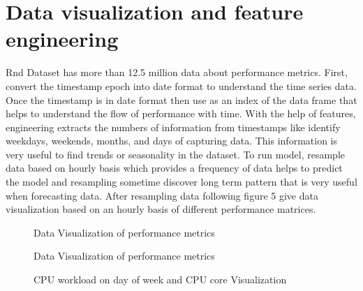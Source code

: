 \section{ Data visualization and  feature engineering}
Rnd Dataset has more than 12.5 million data about performance metrics. First, convert the timestamp epoch into date format to understand the time series data. Once the timestamp is in date format then use as an index of the data frame that helps to understand the flow of performance with time. With the help of features, engineering extracts the numbers of information from timestamps like identify weekdays, weekends, months, and days of capturing data. This information is very useful to find trends or seasonality in the dataset. To run model, resample data based on hourly basis which provides a frequency of data helps to predict the model and resampling sometime discover long term pattern that is very useful when forecasting data.
After resampling data following figure 5 give data visualization based on an hourly basis of different performance matrices.




\begin{figure}[htp]


\caption{Data Visualization of performance metrics}
\label{fig:visual1}
\end{figure}


\begin{figure}[htp]


\caption{Data Visualization of performance metrics }
\label{fig:visual}
\end{figure}



\begin{figure}[htp]

\qquad
{}
\caption{CPU workload on day of week and CPU core Visualization }
\label{fig:core1}
\end{figure}

